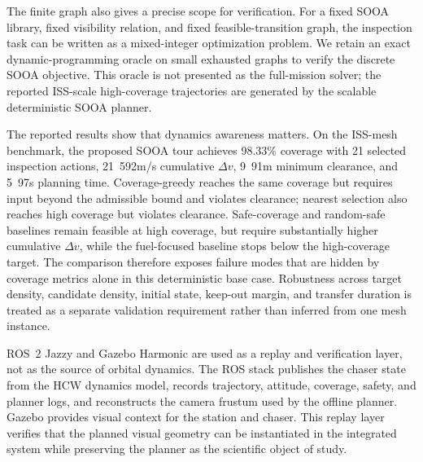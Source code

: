 The finite graph also gives a precise scope for verification. For a fixed SOOA
library, fixed visibility relation, and fixed feasible-transition graph, the
inspection task can be written as a mixed-integer optimization problem. We
retain an exact dynamic-programming oracle on small exhausted graphs to verify
the discrete SOOA objective. This oracle is not presented as the full-mission
solver; the reported ISS-scale high-coverage trajectories are generated by the
scalable deterministic SOOA planner.

The reported results show that dynamics awareness matters. On the ISS-mesh
benchmark, the proposed SOOA tour achieves 98.33\% coverage with 21
selected inspection actions, \unit{21.592}{m/s} cumulative $\Delta v$, \unit{9.91}{m}
minimum clearance, and \unit{5.97}{s} planning time. Coverage-greedy reaches
the same coverage but requires input beyond the admissible bound and violates
clearance; nearest selection also reaches high coverage but violates
clearance. Safe-coverage and random-safe baselines remain feasible at high
coverage, but require substantially higher cumulative $\Delta v$, while the
fuel-focused baseline stops below the high-coverage target. The comparison
therefore exposes failure modes that are hidden by coverage metrics alone in
this deterministic base case. Robustness across target density, candidate
density, initial state, keep-out margin, and transfer duration is treated as a
separate validation requirement rather than inferred from one mesh instance.

ROS~2 Jazzy and Gazebo Harmonic are used as a replay and verification layer,
not as the source of orbital dynamics. The ROS stack publishes the chaser
state from the HCW dynamics model, records trajectory, attitude, coverage,
safety, and planner logs, and reconstructs the camera frustum used by the
offline planner. Gazebo provides visual context for the station and chaser.
This replay layer verifies that the planned visual geometry can be
instantiated in the integrated system while preserving the planner as the
scientific object of study.

